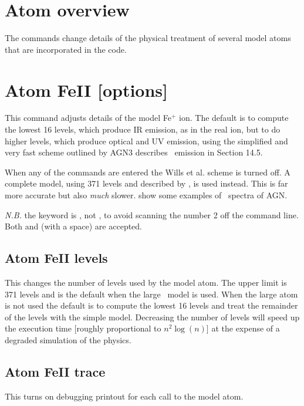 \section{Atom overview}

The  commands change details of the physical treatment of several
model atoms that are incorporated in the code.

\section{Atom FeII [options]}
\label{sec:AtomFeIICommand}

This command adjusts details of the model Fe$^+$ ion.
The default is to
compute the lowest 16 levels, which produce IR emission, as in the real
ion, but to do higher levels, which produce optical and UV emission, using
the simplified and very fast scheme outlined by \citet{Wills1985}
AGN3 describes \feii\ emission in Section 14.5.

When any of the  commands are entered
the Wills et al. scheme is turned off.
A complete model, using 371 levels and described by \citet{Verner1999}, is used instead.
This is far more accurate but also \emph{much} slower.
\citet{Baldwin2004} show some examples of \feii\ spectra of AGN.

\emph{N.B.} the keyword is , not ,
to avoid scanning the number 2 off the command line.
Both  and  (with a space) are accepted.

\subsection{Atom FeII levels}

This changes the number of levels used by the model atom.
The upper
limit is 371 levels and is the default when the large \feii\ model is used.
When the large atom is not used the default is to compute
the lowest 16
levels and treat the remainder of the levels with the \citet{Wills1985}
simple model.
Decreasing the number of levels will speed up the execution
time [roughly proportional to $n^2 \log(n)]$ at the expense of a degraded
simulation of the physics.

\subsection{Atom FeII trace}

This turns on debugging printout for each call to the model atom.


